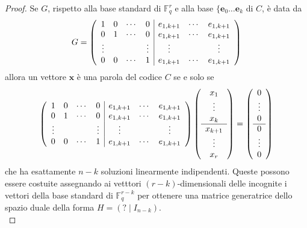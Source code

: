 \begin{proof}
   Se $G$, rispetto alla base standard di $\mathbb{F}_{q}^{r}$ e alla base $\lbrace \mathbf{e}_{0} \dots \mathbf{e}_{k} $ di $C$, è data da 
   \begin{align*}
      G=
      \left(
      \begin{array} {c c c c | c c c }
      1 & 0 & \cdots & 0 & e_{1,k+1} & \cdots &e_{1,k+1}   \\
      0 & 1 & \cdots & 0 & e_{1,k+1} & \cdots &e_{1,k+1}   \\
       \vdots & &  & \vdots & \vdots  &  &  \vdots   \\
      0 & 0 & \cdots & 1 & e_{1,k+1} & \cdots &e_{1,k+1}   
      \end{array}
      \right)
   \end{align*}
   allora un vettore $\mathbf{x}$ è una parola del codice $C$ se e solo se 
   \begin{align*}
      \left(
      \begin{array} {c c c c | c c c }
      1 & 0 & \cdots & 0 & e_{1,k+1} & \cdots &e_{1,k+1}   \\
      0 & 1 & \cdots & 0 & e_{1,k+1} & \cdots &e_{1,k+1}   \\
       \vdots & &  & \vdots & \vdots  &  &  \vdots   \\
      0 & 0 & \cdots & 1 & e_{1,k+1} & \cdots &e_{1,k+1}   
      \end{array}
      \right)
      \left(
      \begin{array} {c  }
      x_1    \\
      \vdots    \\
      x_{k}   \\
      \hline 
      x_{k + 1}   \\
       \vdots    \\
      x_{r}   \\  
      \end{array}
      \right) 
      =
      \left(
      \begin{array} {c  }
      0    \\
      \vdots    \\
      0   \\
      \hline 
      0   \\
       \vdots    \\
      0   \\  
      \end{array}
      \right)
   \end{align*}
   che ha esattamente $n-k$ soluzioni linearmente indipendenti. Queste possono essere costuite assegnando ai vetttori $(r-k)$-dimensionali delle incognite i vettori della base standard di $\mathbb{F}_{q}^{r-k}$ per ottenere una matrice generatrice dello spazio duale della forma $H = ( ? \mid I_{n-k})$. \\

\end{proof}
